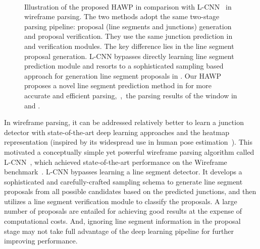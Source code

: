 \documentclass[10pt,twocolumn,letterpaper]{article}
\begin{document}
\begin{figure}
    \centering
{}
    \\
\caption{\small Illustration of the proposed HAWP in comparison with L-CNN~\cite{ZhouQM19} in wireframe parsing. The two methods adopt the same two-stage parsing pipeline: proposal (line segments and junctions) generation and proposal verification. They use the same junction prediction in  and verification modules. The key difference lies in the line segment proposal generation. L-CNN bypasses directly learning line segment prediction module and resorts to a sophisticated sampling based approach for generation line segment proposals in . Our HAWP proposes a novel line segment prediction method in  for more accurate and efficient parsing,~\eg,~the parsing results of the window in  and .}
    \vspace{3mm}
    \label{fig:teaser}
\end{figure}

In wireframe parsing, it can be addressed relatively better to learn a junction detector with state-of-the-art deep learning approaches and the heatmap representation (inspired by its widespread use in human pose estimation~\cite{NewellYD16,VarolCRYYLS18,ZhouZPLDD19}). This motivated a conceptually simple yet powerful wireframe parsing algorithm called L-CNN~\cite{ZhouQM19}, which achieved state-of-the-art performance on the Wireframe benchmark~\cite{Huang2018a}. L-CNN bypasses learning a line segment detector. It develops a sophisticated and carefully-crafted sampling schema to generate line segment proposals from all possible candidates based on the predicted junctions, and then utilizes a line segment verification module to classify the proposals. A large number of proposals are entailed for achieving good results at the expense of computational costs. And, ignoring line segment information in the proposal stage may not take full advantage of the deep learning pipeline for further improving performance.
\end{document}

